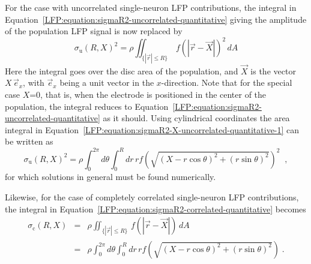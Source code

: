 For the case with uncorrelated single-neuron LFP contributions, the integral in Equation~\ref{LFP:equation:sigmaR2-uncorrelated-quantitative}
giving the amplitude of the population LFP signal is now replaced by~\citep{Einevoll2013a} 
\begin{equation}
\sigma_\text{u}(R,X)^2 =  \rho \iint_{\{|\vec{r}|\le R\}}\, f(|\vec{r}-\vec{X}|)^2  \, dA 
\label{LFP:equation:sigmaR2-X-uncorrelated-quantitative-1}
\end{equation}
Here the integral goes over the disc area of the population, and $\vec{X}$ is the vector $X\,\vec{e}_x$, 
with $\vec{e}_x$ being a unit vector in the $x$-direction. Note that for the special case $X$=0, that is, when
the electrode is positioned in the center of the population, the integral reduces to 
Equation~\ref{LFP:equation:sigmaR2-uncorrelated-quantitative} as it should.
Using cylindrical coordinates the area integral in Equation~\ref{LFP:equation:sigmaR2-X-uncorrelated-quantitative-1} 
can be written as
\begin{equation}
\sigma_\text{u}(R,X)^2 
           =  \rho \int_0^{2\pi} d\theta \int_0^R dr \, r f \left( \sqrt{(X-r\cos\theta)^2+(r\sin\theta)^2} \right)^2\;\;, 
\label{LFP:equation:sigmaR2-X-uncorrelated-quantitative}
\end{equation}
for which solutions in general must be found numerically. 

Likewise, for the case of completely correlated single-neuron LFP contributions, 
the integral in Equation~\ref{LFP:equation:sigmaR2-correlated-quantitative} becomes
\begin{eqnarray}
  \sigma_\text{c}(R,X) & = &  \rho \iint_{\{|\vec{r}|\le R\}} \, f(|\vec{r}-\vec{X}|)   \, dA \nonumber \\
           & = &  \rho \int_0^{2\pi} d\theta \int_0^R dr \, r f \left( \sqrt{(X-r\cos\theta)^2+(r\sin\theta)^2}\right) \;.
\label{LFP:equation:sigmaR2-X-correlated-quantitative}           
\end{eqnarray}

